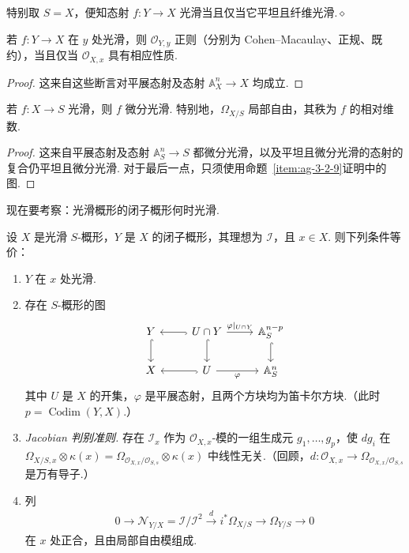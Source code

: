 \begin{remark}\label{item:ag-3-4-6}
特别取 $S=X$，便知态射 $f:Y\longrightarrow X$ 光滑当且仅当它平坦且纤维光滑.\unskip\nobreak\hfill\ensuremath{\diamond}
\renewcommand{\envenddiamond}{}
\end{remark}
\begin{proposition}[局部性质]\label{item:ag-3-4-7}
若 $f:Y\longrightarrow X$ 在 $y$ 处光滑，则 $\mathcal O_{Y,y}$ 正则（分别为 Cohen--Macaulay、正规、既约），当且仅当 $\mathcal O_{X,x}$ 具有相应性质.
\end{proposition}
\begin{proof}
这来自这些断言对平展态射及态射 $\mathbb A_X^n\longrightarrow X$ 均成立.
\end{proof}
\begin{proposition}\label{item:ag-3-4-8}
若 $f:X\longrightarrow S$ 光滑，则 $f$ 微分光滑. 特别地，$\Omega_{X/S}$ 局部自由，其秩为 $f$ 的相对维数.
\end{proposition}
\begin{proof}
这来自平展态射及态射 $\mathbb A_S^n\longrightarrow S$ 都微分光滑，以及平坦且微分光滑的态射的复合仍平坦且微分光滑. 对于最后一点，只须使用命题~\ref{item:ag-3-2-9}证明中的图.
\end{proof}
现在要考察：光滑概形的闭子概形何时光滑.
\begin{theorem}\label{item:ag-3-4-9}
设 $X$ 是光滑 $S$-概形，$Y$ 是 $X$ 的闭子概形，其理想为 $\mathcal I$，且 $x\in X$. 则下列条件等价：
\begin{enumerate}[label=\roman*)]
\item $Y$ 在 $x$ 处光滑.
\item 存在 $S$-概形的图
\begin{align*}
\begin{tikzcd}[ampersand replacement=\&]
Y\arrow[d,hook] \& U\cap Y\arrow[l,hook]\arrow[r,"\varphi|_{U\cap Y}"]\arrow[d,hook] \& \mathbb A_S^{n-p}\arrow[d,hook]\\
X \& U\arrow[l,hook]\arrow[r,"\varphi"'] \& \mathbb A_S^n
\end{tikzcd}
\end{align*}
其中 $U$ 是 $X$ 的开集，$\varphi$ 是平展态射，且两个方块均为笛卡尔方块.（此时 $p=\operatorname{Codim}(Y,X)$.）
\item \emph{Jacobian 判别准则.} 存在 $\mathcal I_x$ 作为 $\mathcal O_{X,x}$-模的一组生成元 $g_1,\ldots,g_p$，使 $dg_i$ 在 $\Omega_{X/S,x}\otimes\kappa(x)=\Omega_{\mathcal O_{X,x}/\mathcal O_{S,s}}\otimes\kappa(x)$ 中线性无关.（回顾，$d:\mathcal O_{X,x}\longrightarrow\Omega_{\mathcal O_{X,x}/\mathcal O_{S,s}}$ 是万有导子.）
\item 列
\begin{align*}
0\longrightarrow\mathcal N_{Y/X}=\mathcal I/\mathcal I^2\xrightarrow d i^*\Omega_{X/S}\longrightarrow\Omega_{Y/S}\longrightarrow0
\end{align*}
在 $x$ 处正合，且由局部自由模组成.
\end{enumerate}
\end{theorem}

